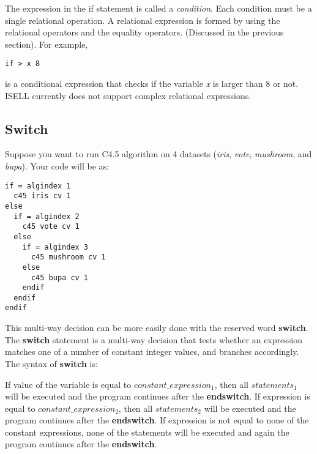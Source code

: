 \documentclass[a4paper,12pt]{book}
\begin{document}
The expression in the if statement is called a {\em condition}.  Each condition must be a single relational operation. A relational expression is formed by using the relational operators and the equality operators. (Discussed in the previous section). For example,
\begin{verbatim}
if > x 8
\end{verbatim}
is a conditional expression that checks if the variable \textsl{x} is larger than 8 or not. ISELL currently does not support complex relational expressions. 

\subsection{Switch}

Suppose you want to run C4.5 algorithm on 4 datasets ({\em iris}, {\em vote}, {\em mushroom}, and {\em bupa}). Your code will be as:
\begin{verbatim}
if = algindex 1
  c45 iris cv 1
else 
  if = algindex 2
    c45 vote cv 1
  else
    if = algindex 3
      c45 mushroom cv 1
    else
      c45 bupa cv 1
    endif
  endif
endif
\end{verbatim}

This multi-way decision can be more easily done with the reserved word {\bf switch}.
The {\bf switch} statement is a multi-way decision that tests whether an expression matches one of a number of constant integer values, and branches accordingly.  The syntax of {\bf switch} is:
\begin{center}
\end{center}
If value of the variable is equal to $constant\_expression_1$, then all $statements_1$ will be executed and the program continues after the {\bf endswitch}. If expression is equal to $constant\_expression_2$, then all $statements_2$ will be executed and the program continues after the {\bf endswitch}. If expression is not equal to none of the constant expressions, none of the statements will be executed and again the program continues after the {\bf endswitch}.
\end{document}

